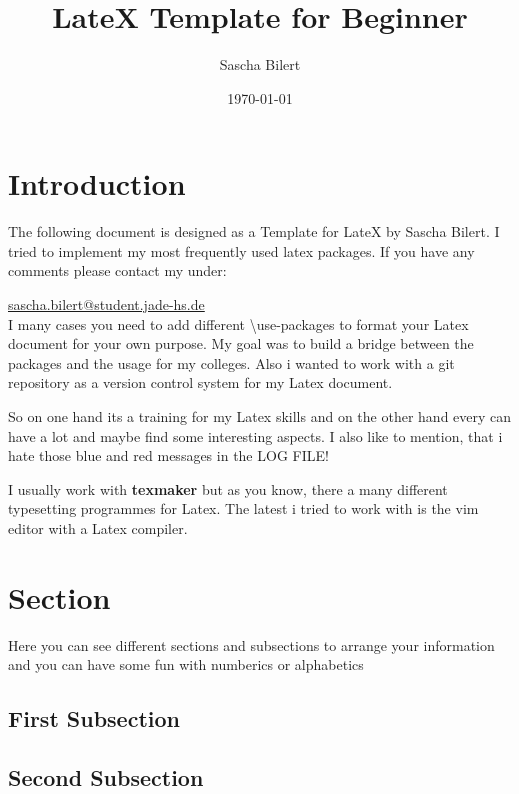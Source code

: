 \documentclass[11pt, a4paper]{article}
\begin{document}
\title{LateX Template for Beginner}
\author{Sascha Bilert}
\date{\today}
\maketitle
\thispagestyle{empty}
\tableofcontents

\pagebreak


\section{Introduction}

The following document is designed as a Template for LateX by Sascha Bilert. I tried to implement my most frequently used latex packages. If you have any comments please contact my under:

\href{mailto:sascha.bilert@student.jade-hs.de}{sascha.bilert@student.jade-hs.de}\\
I many cases you need to add different \textbackslash use-packages to format your Latex document for your own purpose. My goal was to build a bridge between the packages and the usage for my colleges. Also i wanted to work with a git repository as a version control system for my Latex document.

So on one hand its a training for my Latex skills and on the other hand every can have a lot and maybe find some interesting aspects. I also like to mention, that i hate those {\color{blue}blue} and {\color{red}red} messages in the LOG FILE!

I usually work with \textbf{texmaker} but as you know, there a many different typesetting programmes for Latex. The latest i tried to work with is the vim editor with a Latex compiler.

\section{Section}

Here you can see different sections and subsections to arrange your information and you can have some fun with numberics or alphabetics

\subsection{First Subsection}

\subsection{Second Subsection}
\end{document}
